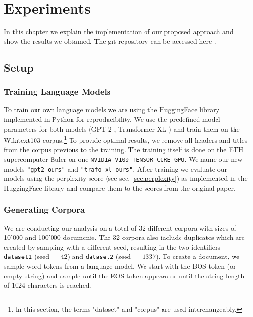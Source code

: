 \chapter{Experiments}\label{chp:experiments}
In this chapter we explain the implementation of our proposed approach and show the results we obtained. The git repository can be accessed here \cite{gitrepo}.

\section{Setup}
\subsection{Training Language Models}
To train our own language models we are using the HuggingFace library \cite{huggingface} implemented in Python for reproducibility. We use the predefined model parameters for both models (GPT-2 \cite{gpt2model}, Transformer-XL \cite{trafoxlmodel}) and train them on the Wikitext103 \cite{merity2016pointer,wikitext} corpus.\footnote{In this section, the terms "dataset" and "corpus" are used interchangeably.} To provide optimal results, we remove all headers and titles from the corpus previous to the training. The training itself is done on the ETH supercomputer Euler \cite{euler} on one \texttt{NVIDIA V100 TENSOR CORE GPU}. We name our new models \texttt{"gpt2\_ours"} and \texttt{"trafo\_xl\_ours"}. After training we evaluate our models using the perplexity score (see sec. \ref{sec:perplexity}) as implemented in the HuggingFace library and compare them to the scores from the original paper. 

\subsection{Generating Corpora}
We are conducting our analysis on a total of 32 different corpora with sizes of 10'000 and 100'000 documents. The 32 corpora also include duplicates which are created by sampling with a different seed, resulting in the two identifiers \texttt{dataset1} (seed $=42$) and \texttt{dataset2} (seed $=1337$). To create a document, we sample word tokens from a language model. We start with the BOS token (or empty string) and sample until the EOS token appears or until the string length of $1024$ characters is reached. 

